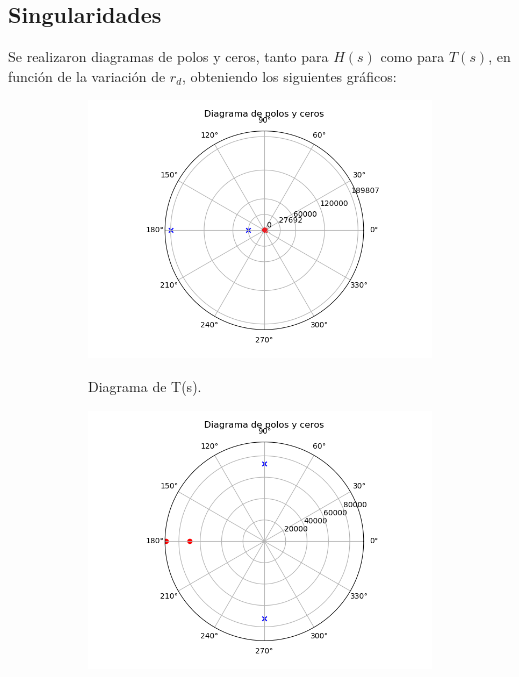 \subsection{Singularidades}
Se realizaron diagramas de polos y ceros, tanto para $H(s)$ como para $T(s)$, en función de la variación de $r_d$, obteniendo los siguientes gráficos:
\begin{figure}[H]
\centering
\begin{subfigure}{.45\textwidth}
\centering
	\includegraphics[width=\textwidth]{Imagenes-Ej1/Tr=1.png}
	\label{fig:poleZeroDiagTs}
	\caption{Diagrama de T(s).}
\end{subfigure}
\begin{subfigure}{.45\textwidth}
\centering
	\includegraphics[width=\textwidth]{Imagenes-Ej1/Hr=1.png}

\end{subfigure}
\end{figure}
